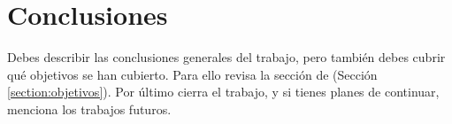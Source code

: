 \chapter{Conclusiones}\label{chapter:conclusiones}

Debes describir las conclusiones generales del trabajo, pero también debes cubrir qué objetivos se han cubierto. Para ello revisa la sección de  (Sección \ref{section:objetivos}).
Por último cierra el trabajo, y si tienes planes de continuar, menciona los trabajos futuros.